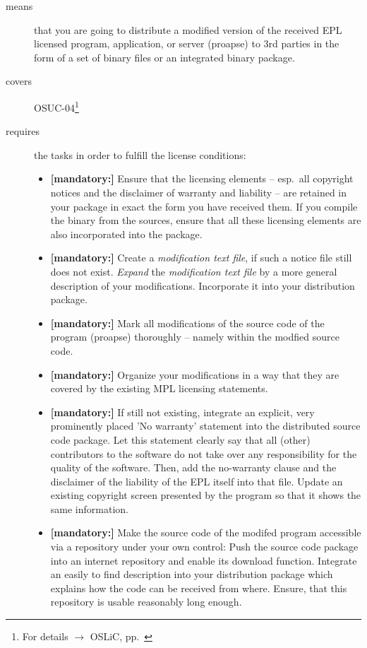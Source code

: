 \begin{description}
\item[means] that you are going to distribute a modified version of the received
EPL licensed pro\-gram, application, or server (proapse) to 3rd parties in
the form of a set of binary files or an integrated binary package.
\item[covers] OSUC-04\footnote{For details $\rightarrow$ OSLiC, pp.\ \pageref{OSUC-04-DEF}}
\item[requires] the tasks in order to fulfill the license conditions:
\begin{itemize}

  \item \textbf{[mandatory:]} Ensure that the licensing elements -- esp.\ all
  copyright notices and the disclaimer of warranty and liability -- are retained
  in your package in exact the form you have received them. If you compile the
  binary from the sources, ensure that all these licensing elements are also
  incorporated into the package.

  \item \textbf{[mandatory:]} Create a \emph{modification text file}, if such a
  notice file still does not exist. \emph{Expand} the \emph{modification text
  file} by a more general description of your modifications. Incorporate it into
  your distribution package.

  \item \textbf{[mandatory:]} Mark all modifications of the source code of the
  program (proapse) thoroughly -- namely within the
  modfied source code.
  
  \item \textbf{[mandatory:]} Organize your modifications in a way that they are
  covered by the existing MPL licensing statements.

  \item \textbf{[mandatory:]} If still not existing, integrate an explicit, very
  prominently placed 'No warranty' statement into the distributed source code
  package. Let this statement clearly say that all (other) contributors to the
  software do not take over any responsibility for the quality of the software.
  Then, add the no-warranty clause and the disclaimer of the liability of the
  EPL itself into that file. Update an existing copyright screen presented by
  the program so that it shows the same information.

  \item \textbf{[mandatory:]} Make the source code of the modifed program
  accessible via a repository under your own control: Push the source code
  package into an internet repository and enable its download function.
  Integrate an easily to find description into your distribution package which
  explains how the code can be received from where. Ensure, that this repository
  is usable reasonably long enough.
  

\end{itemize}
\end{description}
